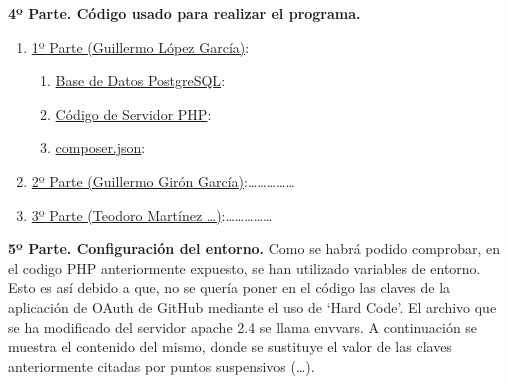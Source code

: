 \documentclass{article}
\begin{document}
\textbf{4º Parte. Código usado para realizar el programa.}
\begin{enumerate}
    \item \underline{1º Parte (Guillermo López García)}:
        \begin{enumerate}
            \item \underline{Base de Datos PostgreSQL}:
                
            \item \underline{Código de Servidor PHP}:
                
            \item \underline{composer.json}:
                
        \end{enumerate}
    \item \underline{2º Parte (Guillermo Girón García)}:\ldots\ldots\ldots\ldots\ldots
    \item \underline{3º Parte (Teodoro Martínez \ldots)}:\ldots\ldots\ldots\ldots\ldots
\end{enumerate}

\textbf{5º Parte. Configuración del entorno.}
Como se habrá podido comprobar, en el codigo PHP anteriormente expuesto, se
han utilizado variables de entorno. Esto es así debido a que, no se quería
poner en el código las claves de la aplicación de OAuth de GitHub mediante el
uso de `Hard Code'. El archivo que se ha modificado del servidor apache 2.4
se llama envvars. A continuación se muestra el contenido del mismo, donde
se sustituye el valor de las claves anteriormente citadas por puntos suspensivos
(\ldots).


\end{document}
